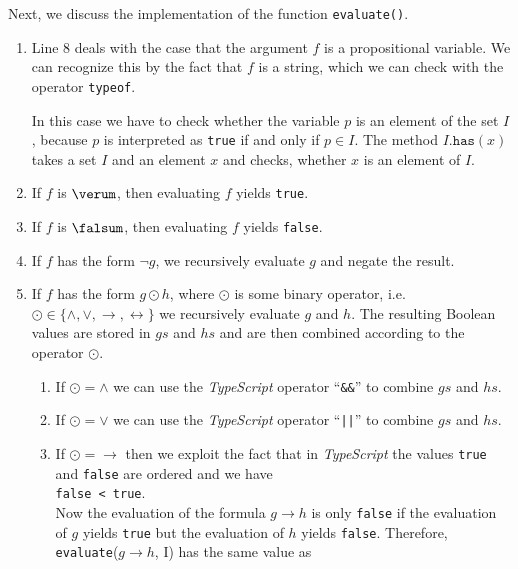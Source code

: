 \noindent
Next, we discuss the implementation of the function \texttt{evaluate()}.
\begin{enumerate}
\item Line 8 deals with the case that the argument $f$ is a propositional variable.  We can recognize this by
      the fact that $f$ is a string, which we can check with the operator
      \texttt{typeof}.

      In this case we have to check whether the variable $p$ is an element of the set $I$, because $p$ is
      interpreted as \texttt{true} if and only if $p \in I$.  The method $I\mathtt{.has}(x)$
      takes a set $I$ and an element $x$ and checks, whether $x$ is an element of $I$.
\item If $f$ is $\verum$, then evaluating $f$ yields \texttt{true}.
\item If $f$ is $\falsum$, then evaluating $f$ yields \texttt{false}. 
\item If $f$ has the form $\neg g$, we recursively evaluate $g$  and negate the result.
\item If $f$ has the form $g \odot h$, where $\odot$ is some binary operator, i.e.~
      $\odot \in \{\wedge, \vee, \rightarrow, \leftrightarrow\}$ we recursively evaluate
      $g$ and $h$.  The resulting Boolean values are stored in $gs$ and $hs$ and are
      then combined according to the operator $\odot$.
      \begin{enumerate}
      \item If $\odot = \wedge$ we can use the \textsl{TypeScript} operator ``\texttt{\&\&}''
            to combine $gs$ and $hs$.
      \item If $\odot = \vee$ we can use the \textsl{TypeScript} operator ``\texttt{||}''
            to combine $gs$ and $hs$.
      \item If $\odot = \rightarrow$ then we exploit the fact that in \textsl{TypeScript} the values \texttt{true} and
            \texttt{false} are ordered and we have
            \\[0.2cm]
            \hspace*{1.3cm}
            \texttt{false < true}.
            \\[0.2cm]
            Now the evaluation of the formula $g \rightarrow h$ is only \texttt{false} if the evaluation of $g$ yields \texttt{true} but the
            evaluation of $h$ yields \texttt{false}.  Therefore, 
            \\[0.2cm]
            \hspace*{1.3cm}
            \texttt{evaluate}($g \rightarrow h$, I) \quad has the same value as \quad

\end{enumerate}
\end{enumerate}
